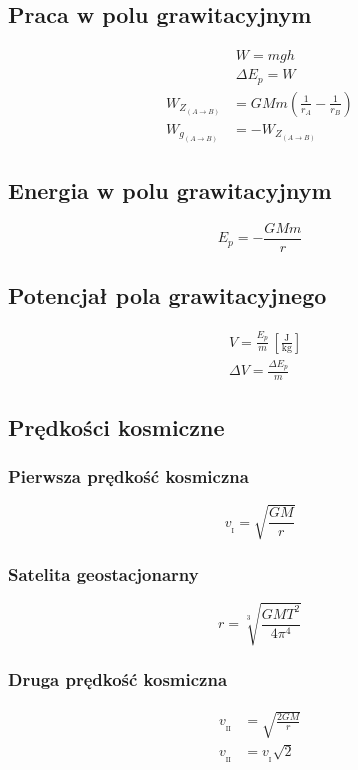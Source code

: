 \documentclass{article}
\numberwithin{equation}{section}
\newcommand{\unit}[1]{\, \left[\mathrm{#1}\right]}
\begin{document}
    \subsection{Praca w polu grawitacyjnym}
      \begin{align}
        &W = mgh\\
        &\Delta E_p = W
      \end{align}
      \begin{align}
        W_{Z_{(A\rightarrow B)}} &= GMm\left(\frac{1}{r_A} - \frac{1}{r_B}\right)\\
        W_{g_{(A\rightarrow B)}} &= -W_{Z_{(A\rightarrow B)}}
      \end{align}
    \subsection{Energia w polu grawitacyjnym}
      \begin{equation}
        E_p = -\frac{GMm}{r}
      \end{equation}
    \subsection{Potencjał pola grawitacyjnego}
      \begin{align}
        &V = \frac{E_p}{m} \unit{\frac{J}{kg}}\\
        &\Delta V = \frac{\Delta E_p}{m}
      \end{align}
    \subsection{Prędkości kosmiczne}
      \subsubsection{Pierwsza prędkość kosmiczna}
        \begin{equation}
          v_{{}_\mathrm{I}} = \sqrt{\frac{GM}{r}}
        \end{equation}
      \subsubsection{Satelita geostacjonarny}
        \begin{equation}
          r = \sqrt[3]{\frac{GMT^2}{4\pi^4}}
        \end{equation}
      \subsubsection{Druga prędkość kosmiczna}
        \begin{align}
          v_{{}_\mathrm{II}} &= \sqrt{\frac{2GM}{r}}\\
          v_{{}_\mathrm{II}} &= v_{{}_\mathrm{I}}\sqrt{2}
        \end{align}
\end{document}
